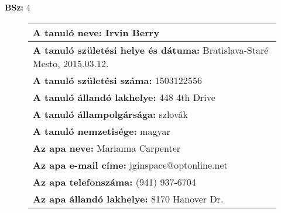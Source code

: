 \documentclass[10pt,a4paper]{article}
\begin{document}
    \vfill
    \textbf{BSz: }4
\newpage
    \begin{figure}[!ht]
    \begin{tabular}{|m{\textwidth}|}
    \hline \vspace{3pt}
    \textbf{A tanuló neve:} \hspace{0.5cm} Irvin Berry \vspace{3pt} \\
\hline\vspace{3pt}
\textbf{A tanuló születési helye és dátuma:} \hspace{0.5cm} Bratislava-Staré Mesto, 2015.03.12. \vspace{3pt} \\
\hline\vspace{3pt}
\textbf{A tanuló születési száma:} \hspace{0.5cm} 1503122556 \vspace{3pt} \\
\hline\vspace{3pt}
\textbf{A tanuló állandó lakhelye:} \hspace{0.5cm} 448 4th Drive \vspace{3pt} \\
\hline\vspace{3pt}
\textbf{A tanuló állampolgársága:} \hspace{0.5cm} szlovák \vspace{3pt} \\
\hline\vspace{3pt}
\textbf{A tanuló nemzetisége:} \hspace{0.5cm} magyar \vspace{3pt} \\
\hline\vspace{3pt}
\textbf{Az apa neve:} \hspace{0.5cm} Marianna Carpenter \vspace{3pt} \\
\hline\vspace{3pt}
\textbf{Az apa e-mail címe:} \hspace{0.5cm} jginspace@optonline.net \vspace{3pt} \\
\hline\vspace{3pt}
\textbf{Az apa telefonszáma:} \hspace{0.5cm} (941) 937-6704 \vspace{3pt} \\
\hline\vspace{3pt}
\textbf{Az apa állandó lakhelye:} \hspace{0.5cm} 8170 Hanover Dr. \vspace{3pt} \\

\end{tabular}
\end{figure}
\end{document}
